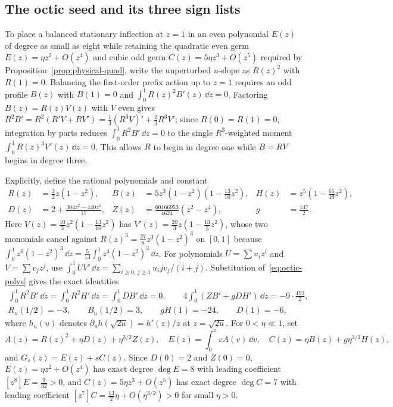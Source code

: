 \subsection{The octic seed and its three sign lists}\label{subsec:octic-base}
To place a balanced stationary inflection at $z=1$ in an even polynomial $E(z)$ of degree as small as eight while retaining the quadratic even germ $E(z)=\eta z^2+O(z^4)$ and cubic odd germ $C(z)=5\eta z^3+O(z^5)$ required by Proposition~\ref{prop:physical-quad}, write the unperturbed $u$-slope as $R(z)^2$ with $R(1)=0$. Balancing the first-order prefix action up to $z=1$ requires an odd profile $B(z)$ with $B(1)=0$ and $\int_0^1 R(z)^2 B'(z)\,\dd z=0$. Factoring $B(z)=R(z)V(z)$ with $V$ even gives $R^2 B'=R^2(R'V+RV')=\frac13(R^3V)'+\frac23 R^3 V'$; since $R(0)=R(1)=0$, integration by parts reduces $\int_0^1 R^2 B'\,\dd z=0$ to the single $R^3$-weighted moment $\int_0^1 R(z)^3 V'(z)\,\dd z=0$. This allows $R$ to begin in degree one while $B=RV$ begins in degree three.

Explicitly, define the rational polynomials and constant
\begin{equation}\label{eq:octic-polys}
  \begin{aligned}
    R(z) &= \tfrac32 z(1-z^2), &
    B(z) &= 5z^3(1-z^2)\!\left(1-\tfrac{13}{10}z^2\right), &
    H(z) &= z^5\!\left(1-\tfrac{65}{49}z^2\right),\\
    D(z) &= 2 + \frac{304z^2-440z^4}{17}, &
    Z(z) &= \frac{60166953}{4624}(z^2-z^4), &
    g    &= \frac{147}{2}.
  \end{aligned}
\end{equation}
Here $V(z)=\frac{10}{3}z^2(1-\frac{13}{10}z^2)$ has $V'(z)=\frac{20}{3}z(1-\frac{13}{5}z^2)$, whose two monomials cancel against $R(z)^3=\frac{27}{8}z^3(1-z^2)^3$ on $[0,1]$ because $\int_0^1 z^6(1-z^2)^3\,\dd z=\frac{5}{13}\int_0^1 z^4(1-z^2)^3\,\dd z$. For polynomials $U=\sum u_i z^i$ and $V=\sum v_j z^j$, use
$\int_0^1 UV'\,\dd z=\sum_{i\ge0,\,j\ge1}u_i jv_j/(i+j)$.
Substitution of~\eqref{eq:octic-polys} gives the exact identities
\begin{equation}\label{eq:octic-moments}
  \begin{gathered}
    \int_0^1 R^2 B'\,\dd z = \int_0^1 R^2 H'\,\dd z = \int_0^1 D B'\,\dd z = 0,\qquad
    4\int_0^1 (Z B' + g D H')\,\dd z = -9\cdot\frac{493}{2},\\
    R_u(1/2) = -3,\qquad B_u(1/2) = 3,\qquad gH(1) = -24,\qquad D(1) = -6,
  \end{gathered}
\end{equation}
where $h_u(u)$ denotes $\partial_u h(\sqrt{2u})=h'(z)/z$ at $z=\sqrt{2u}$. For $0<\eta\ll 1$, set
\begin{equation}\label{eq:octic-family}
  A(z) = R(z)^2 + \eta D(z) + \eta^{3/2} Z(z),\quad
  E(z) = \int_0^z vA(v)\,\dd v,\quad
  C(z) = \eta B(z) + g\eta^{3/2} H(z),
\end{equation}
and $G_s(z)=E(z)+sC(z)$. Since $D(0)=2$ and $Z(0)=0$, $E(z)=\eta z^2+O(z^4)$ has exact degree $\deg E=8$ with leading coefficient $[z^8]E=\frac{9}{32}>0$, and $C(z)=5\eta z^3+O(z^5)$ has exact degree $\deg C=7$ with leading coefficient $[z^7]C=\frac{13}{2}\eta+O(\eta^{3/2})>0$ for small $\eta>0$.


